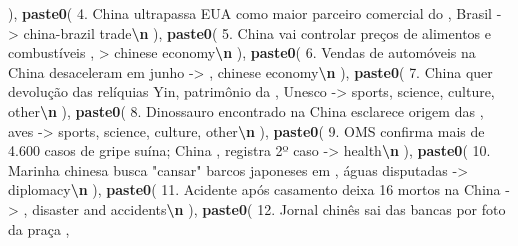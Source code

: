 \documentclass[referee,pdflatex,sn-basic]{sn-jnl}
\newenvironment{Shaded}{\begin{snugshade}}{\end{snugshade}}
\newcommand{\FunctionTok}[1]{\textcolor[rgb]{0.13,0.29,0.53}{\textbf{#1}}}
\newcommand{\NormalTok}[1]{#1}
\newcommand{\SpecialCharTok}[1]{\textcolor[rgb]{0.81,0.36,0.00}{\textbf{#1}}}
\newcommand{\StringTok}[1]{\textcolor[rgb]{0.31,0.60,0.02}{#1}}
\theoremstyle{thmstylethree}
\begin{document}
\begin{Shaded}
\begin{Highlighting}[]
\NormalTok{  ),}
  \FunctionTok{paste0}\NormalTok{(}
    \StringTok{\textquotesingle{}4. China ultrapassa EUA como maior parceiro comercial do \textquotesingle{}}\NormalTok{,}
    \StringTok{\textquotesingle{}Brasil {-}\textgreater{} china{-}brazil trade}\SpecialCharTok{\textbackslash{}n}\StringTok{\textquotesingle{}}
\NormalTok{  ),}
  \FunctionTok{paste0}\NormalTok{(}
    \StringTok{\textquotesingle{}5. China vai controlar preços de alimentos e combustíveis \textquotesingle{}}\NormalTok{,}
    \StringTok{\textquotesingle{}{-}\textgreater{} chinese economy}\SpecialCharTok{\textbackslash{}n}\StringTok{\textquotesingle{}}
\NormalTok{  ),}
  \FunctionTok{paste0}\NormalTok{(}
    \StringTok{\textquotesingle{}6. Vendas de automóveis na China desaceleram em junho {-}\textgreater{} \textquotesingle{}}\NormalTok{,}
    \StringTok{\textquotesingle{}chinese economy}\SpecialCharTok{\textbackslash{}n}\StringTok{\textquotesingle{}}
\NormalTok{  ),}
  \FunctionTok{paste0}\NormalTok{(}
    \StringTok{\textquotesingle{}7. China quer devolução das relíquias Yin, patrimônio da \textquotesingle{}}\NormalTok{,}
    \StringTok{\textquotesingle{}Unesco {-}\textgreater{} sports, science, culture, other}\SpecialCharTok{\textbackslash{}n}\StringTok{\textquotesingle{}}
\NormalTok{  ),}
  \FunctionTok{paste0}\NormalTok{(}
    \StringTok{\textquotesingle{}8. Dinossauro encontrado na China esclarece origem das \textquotesingle{}}\NormalTok{,}
    \StringTok{\textquotesingle{}aves {-}\textgreater{} sports, science, culture, other}\SpecialCharTok{\textbackslash{}n}\StringTok{\textquotesingle{}}
\NormalTok{  ),}
  \FunctionTok{paste0}\NormalTok{(}
    \StringTok{\textquotesingle{}9. OMS confirma mais de 4.600 casos de gripe suína; China \textquotesingle{}}\NormalTok{,}
    \StringTok{\textquotesingle{}registra 2º caso {-}\textgreater{} health}\SpecialCharTok{\textbackslash{}n}\StringTok{\textquotesingle{}}
\NormalTok{  ),}
  \FunctionTok{paste0}\NormalTok{(}
    \StringTok{\textquotesingle{}10. Marinha chinesa busca "cansar" barcos japoneses em \textquotesingle{}}\NormalTok{,}
    \StringTok{\textquotesingle{}águas disputadas {-}\textgreater{} diplomacy}\SpecialCharTok{\textbackslash{}n}\StringTok{\textquotesingle{}}
\NormalTok{  ),}
  \FunctionTok{paste0}\NormalTok{(}
    \StringTok{\textquotesingle{}11. Acidente após casamento deixa 16 mortos na China {-}\textgreater{} \textquotesingle{}}\NormalTok{,}
    \StringTok{\textquotesingle{}disaster and accidents}\SpecialCharTok{\textbackslash{}n}\StringTok{\textquotesingle{}}
\NormalTok{  ),}
  \FunctionTok{paste0}\NormalTok{(}
    \StringTok{\textquotesingle{}12. Jornal chinês sai das bancas por foto da praça \textquotesingle{}}\NormalTok{,}

\end{Highlighting}
\end{Shaded}
\end{document}
